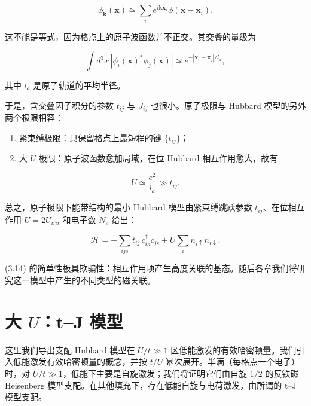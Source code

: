 \begin{equation*}
\phi_ {\mathbf {k}} (\mathbf {x}) \simeq \sum_ {i} e ^ {i \mathbf {kx} _ {i}} \phi (\mathbf {x} - \mathbf {x} _ {i}).
\tag{3.11}
\end{equation*}

这不能是等式，因为格点上的原子波函数并不正交。其交叠的量级为

\begin{equation*}
\int d ^ {3} x \, \left| \phi_ {i} (\mathbf {x}) ^ {*} \phi_ {j} (\mathbf {x}) \right| \simeq e ^ {- | \mathbf {x} _ {i} - \mathbf {x} _ {j} | / l _ {a}},
\tag{3.12}
\end{equation*}

其中 $l_{a}$ 是原子轨道的平均半径。

于是，含交叠因子积分的参数 $t_{ij}$ 与 $J_{ij}$ 也很小。原子极限与 Hubbard 模型的另外两个极限相容：

\begin{enumerate}[itemsep=1pt]
\item 紧束缚极限：只保留格点上最短程的键 $\{t_{ij}\}$；
\item 大 $U$ 极限：原子波函数愈加局域，在位 Hubbard 相互作用愈大，故有
\end{enumerate}

\begin{equation*}
U \simeq \frac {e ^ {2}}{l _ {a}} \gg t _ {ij}.
\tag{3.13}
\end{equation*}

总之，原子极限下能带结构的最小 Hubbard 模型由紧束缚跳跃参数 $t_{ij}$、在位相互作用 $U = 2U_{iiii}$ 和电子数 $N_{e}$ 给出：

\begin{equation*}
\mathcal {H} = - \sum_ {ijs} t _ {ij} \, c _ {is} ^ {\dagger} c _ {js} + U \sum_ {i} n _ {i \uparrow} n _ {i \downarrow}.
\tag{3.14}
\end{equation*}

(3.14) 的简单性极具欺骗性：相互作用项产生高度关联的基态。随后各章我们将研究这一模型中产生的不同类型的磁关联。

\section{大 $U$：t--J 模型}

这里我们导出支配 Hubbard 模型在 $U/t \gg 1$ 区低能激发的有效哈密顿量。我们引入低能激发有效哈密顿量的概念，并按 $t/U$ 幂次展开。半满（每格点一个电子）时，对 $U/t \gg 1$，低能下主要是自旋激发；我们将证明它们由自旋 $1/2$ 的反铁磁 Heisenberg 模型支配。在其他填充下，存在低能自旋与电荷激发，由所谓的 t--J 模型支配。

